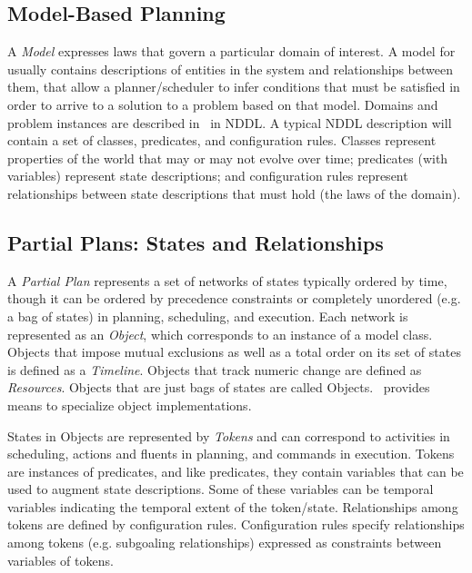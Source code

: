 \documentclass[10pt, letterpaper, twoside]{article}
\begin{document}
\subsection{Model-Based Planning}
\label{mb-plan}
A {\em Model} expresses laws that govern a particular domain of interest.
A model for \ET\, usually contains descriptions of entities in the system
and relationships between them, that allow a planner/scheduler to infer
conditions that must be satisfied in order to arrive to a solution to a
problem based on that model.  Domains and problem instances are
described in \ET\, in NDDL.  A typical NDDL description will contain a set
of classes, predicates, and configuration rules.  Classes represent
properties of the world that may or may not evolve over time; predicates
(with variables) represent state descriptions; and configuration rules
represent relationships between state descriptions that must hold (the laws
of the domain). 

\subsection{Partial Plans: States and Relationships}
\label{partial}
A {\em Partial Plan} represents a set of networks of states typically
ordered by time, though it can be ordered by precedence constraints or
completely unordered (e.g. a bag of states) in planning, scheduling, and
execution. Each network is represented as an {\em Object}, which
corresponds to an instance of a model class.  Objects that impose
mutual exclusions as well as a total order on its set of states is defined
as a {\em Timeline}. Objects that track numeric change are defined as
{\em Resources}.  Objects that are just bags of states are called
Objects. \ET\, provides means to specialize object implementations.

States in Objects are represented by {\em Tokens} and can correspond to
activities in scheduling, actions and fluents in planning, and commands in
execution. Tokens are instances of predicates, and like predicates, they
contain variables that can be used to augment state descriptions. Some of
these variables can be temporal variables indicating the temporal extent of
the token/state.  Relationships among tokens are defined by configuration
rules.  Configuration rules specify relationships among tokens (e.g.
subgoaling relationships) expressed as constraints between variables of
tokens.
\end{document}
